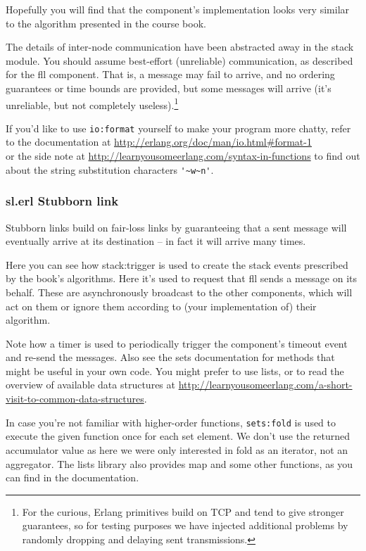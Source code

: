 \documentclass[a4paper]{article}
\begin{document}
Hopefully you will find that the component's implementation looks very
similar to the algorithm presented in the course book.


The details of inter-node communication have been abstracted away in the stack
module. You should assume best-effort (unreliable) communication, as described
for the fll component. That is, a message may fail to arrive, and no ordering
guarantees or time bounds are provided, but some messages will arrive (it's
unreliable, but not completely useless).\footnote{For the curious, Erlang
primitives build on TCP and tend to give stronger guarantees, so for testing
purposes we have injected additional problems by randomly dropping and
delaying sent transmissions.}

If you'd like to use \lstinline!io:format! yourself to make your program more
chatty, refer to the documentation at
\url{http://erlang.org/doc/man/io.html#format-1}\\
or the side note at \url{http://learnyousomeerlang.com/syntax-in-functions}
to find out about the string substitution characters \lstinline!'~w~n'!.


\subsubsection{sl.erl Stubborn link} %
\label{ssub:sl_erl_stubborn_link}

Stubborn links build on fair-loss links by guaranteeing that a sent message
will eventually arrive at its destination – in fact it will arrive many times.

Here you can see how stack:trigger is used to create the stack events
prescribed by the book's algorithms. Here it's used to request that fll sends
a message on its behalf. These are asynchronously broadcast to the other components,
which will act on them or ignore them according to (your implementation of)
their algorithm.

Note how a timer is used to periodically trigger the component's timeout event
and re-send the messages. Also see the sets documentation for methods that
might be useful in your own code. You might prefer to use lists, or to read
the overview of available data structures at
\url{http://learnyousomeerlang.com/a-short-visit-to-common-data-structures}.

In case you're not familiar with higher-order functions, \lstinline!sets:fold!
is used to execute the given function once for each set element. We don't use
the returned accumulator value as here we were only interested in fold as an
iterator, not an aggregator. The lists library also provides map and some
other functions, as you can find in the documentation.
\end{document}
